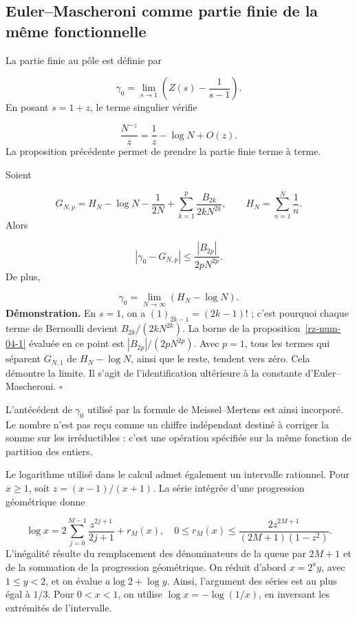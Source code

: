 \subsection{Euler–Mascheroni comme partie finie de la même fonctionnelle}
La partie finie au pôle est définie par

\[
\gamma_0=\lim_{s\to1}\left(Z(s)-\frac1{s-1}\right).
\]
En posant \(s=1+z\), le terme singulier vérifie

\[
\frac{N^{-z}}z=\frac1z-\log N+O(z).
\]
La proposition précédente permet de prendre la partie finie terme à terme.

Soient

\[
G_{N,p}=H_N-\log N-\frac1{2N}
+\sum_{k=1}^p\frac{B_{2k}}{2kN^{2k}},
\qquad H_N=\sum_{n=1}^N\frac1n.
\]
Alors

\[
|\gamma_0-G_{N,p}|\leq\frac{|B_{2p}|}{2pN^{2p}}.
\]
De plus,

\[
\gamma_0=\lim_{N\to\infty}(H_N-\log N).
\]
\textbf{Démonstration.} En \(s=1\), on a \((1)_{2k-1}=(2k-1)!\) ; c’est pourquoi chaque terme de Bernoulli devient \(B_{2k}/(2kN^{2k})\). La borne de la proposition~\ref{rz-num-04-1} évaluée en ce point est \(|B_{2p}|/(2pN^{2p})\). Avec \(p=1\), tous les termes qui séparent \(G_{N,1}\) de \(H_N-\log N\), ainsi que le reste, tendent vers zéro. Cela démontre la limite. Il s’agit de l’identification ultérieure à la constante d’Euler–Mascheroni. \hfill\(\square\)

L'antécédent de \(\gamma_0\) utilisé par la formule de Meissel–Mertens est ainsi incorporé. Le nombre n'est pas reçu comme un chiffre indépendant destiné à corriger la somme sur les irréductibles : c'est une opération spécifiée sur la même fonction de partition des entiers.

Le logarithme utilisé dans le calcul admet également un intervalle rationnel. Pour \(x\geq1\), soit \(z=(x-1)/(x+1)\). La série intégrée d’une progression géométrique donne

\[
\log x=2\sum_{j=0}^{M-1}\frac{z^{2j+1}}{2j+1}+r_M(x),
\quad
0\leq r_M(x)\leq
\frac{2z^{2M+1}}{(2M+1)(1-z^2)}.
\]
L'inégalité résulte du remplacement des dénominateurs de la queue par \(2M+1\) et de la sommation de la progression géométrique. On réduit d'abord \(x=2^a y\), avec \(1\leq y<2\), et on évalue \(a\log2+\log y\). Ainsi, l'argument des séries est au plus égal à \(1/3\). Pour \(0<x<1\), on utilise \(\log x=-\log(1/x)\), en inversant les extrémités de l'intervalle.

